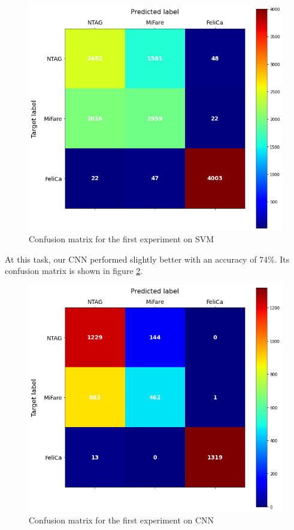 \begin{figure}[htbp!]
  \centering
  \includegraphics[scale=0.5]{figures/ml_svmchip512.png}
  \caption{Confusion matrix for the first experiment on SVM}
  \label{fig:cmsvmchip}
\end{figure}

At this task, our CNN performed slightly better with an accuracy of 74\%. Its confusion matrix is shown in figure \ref{fig:cmcnnchip}.

\begin{figure}[htbp!]
  \centering
  \includegraphics[scale=0.5]{figures/ml_cnnchip512.png}
  \caption{Confusion matrix for the first experiment on CNN}
  \label{fig:cmcnnchip}
\end{figure}

